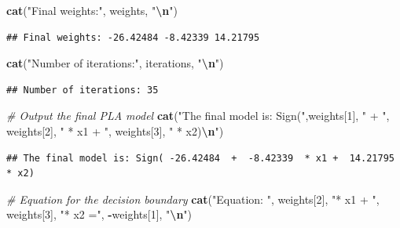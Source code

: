 \documentclass[
]{article}
\newenvironment{Shaded}{\begin{snugshade}}{\end{snugshade}}
\newcommand{\CommentTok}[1]{\textcolor[rgb]{0.56,0.35,0.01}{\textit{#1}}}
\newcommand{\DecValTok}[1]{\textcolor[rgb]{0.00,0.00,0.81}{#1}}
\newcommand{\FunctionTok}[1]{\textcolor[rgb]{0.13,0.29,0.53}{\textbf{#1}}}
\newcommand{\NormalTok}[1]{#1}
\newcommand{\SpecialCharTok}[1]{\textcolor[rgb]{0.81,0.36,0.00}{\textbf{#1}}}
\newcommand{\StringTok}[1]{\textcolor[rgb]{0.31,0.60,0.02}{#1}}
\begin{document}
\begin{Shaded}
\begin{Highlighting}[]
\FunctionTok{cat}\NormalTok{(}\StringTok{"Final weights:"}\NormalTok{, weights, }\StringTok{"}\SpecialCharTok{\textbackslash{}n}\StringTok{"}\NormalTok{)}
\end{Highlighting}
\end{Shaded}

\begin{verbatim}
## Final weights: -26.42484 -8.42339 14.21795
\end{verbatim}

\begin{Shaded}
\begin{Highlighting}[]
\FunctionTok{cat}\NormalTok{(}\StringTok{"Number of iterations:"}\NormalTok{, iterations, }\StringTok{"}\SpecialCharTok{\textbackslash{}n}\StringTok{"}\NormalTok{)}
\end{Highlighting}
\end{Shaded}

\begin{verbatim}
## Number of iterations: 35
\end{verbatim}

\begin{Shaded}
\begin{Highlighting}[]
\CommentTok{\# Output the final PLA model}
\FunctionTok{cat}\NormalTok{(}\StringTok{"The final model is: Sign("}\NormalTok{,weights[}\DecValTok{1}\NormalTok{], }\StringTok{" + "}\NormalTok{, weights[}\DecValTok{2}\NormalTok{], }\StringTok{" * x1 + "}\NormalTok{, weights[}\DecValTok{3}\NormalTok{], }\StringTok{" * x2)}\SpecialCharTok{\textbackslash{}n}\StringTok{"}\NormalTok{)}
\end{Highlighting}
\end{Shaded}

\begin{verbatim}
## The final model is: Sign( -26.42484  +  -8.42339  * x1 +  14.21795  * x2)
\end{verbatim}

\begin{Shaded}
\begin{Highlighting}[]
\CommentTok{\# Equation for the decision boundary}
\FunctionTok{cat}\NormalTok{(}\StringTok{"Equation: "}\NormalTok{, weights[}\DecValTok{2}\NormalTok{], }\StringTok{"* x1 + "}\NormalTok{, weights[}\DecValTok{3}\NormalTok{], }\StringTok{"* x2 ="}\NormalTok{, }\SpecialCharTok{{-}}\NormalTok{weights[}\DecValTok{1}\NormalTok{], }\StringTok{"}\SpecialCharTok{\textbackslash{}n}\StringTok{"}\NormalTok{)}
\end{Highlighting}
\end{Shaded}
\end{document}
